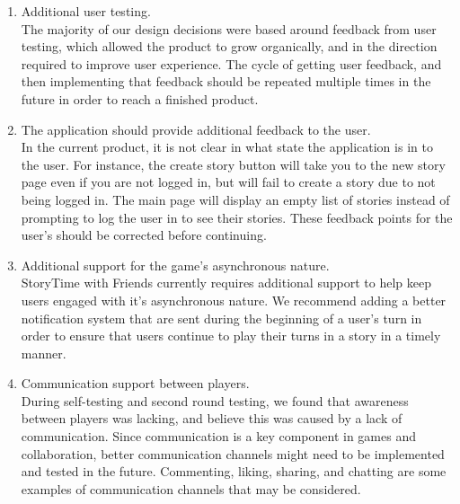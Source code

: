 \documentclass{sigchi}
\begin{document}
\begin{enumerate}
\item Additional user testing. \\

The majority of our design decisions were based around feedback from user testing, which allowed the product to grow organically, and in the direction required to improve user experience. The cycle of getting user feedback, and then implementing that feedback should be repeated multiple times in the future in order to reach a finished product.

\item The application should provide additional feedback to the user. \\

In the current product, it is not clear in what state the application is in to the user. For instance, the create story button will take you to the new story page even if you are not logged in, but will fail to create a story due to not being logged in. The main page will display an empty list of stories instead of prompting to log the user in to see their stories. These feedback points for the user's should be corrected before continuing.

\item Additional support for the game's asynchronous nature. \\

StoryTime with Friends currently requires additional support to help keep users engaged with it's asynchronous nature. We recommend adding a better notification system that are sent during the beginning of a user's turn in order to ensure that users continue to play their turns in a story in a timely manner.

\item Communication support between players. \\

During self-testing and second round testing, we found that awareness between players was lacking, and believe this was caused by a lack of communication. Since communication is a key component in games and collaboration, better communication channels might need to be implemented and tested in the future. Commenting, liking, sharing, and chatting are some examples of communication channels that may be considered.

\end{enumerate}
\end{document}
